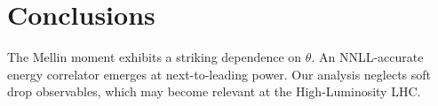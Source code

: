 \section{Conclusions}\label{sec:conclusions}

The Mellin moment exhibits a striking dependence on $\theta$. An
NNLL-accurate energy correlator emerges at next-to-leading power. Our
analysis neglects soft drop observables, which may become relevant at
the High-Luminosity LHC.


